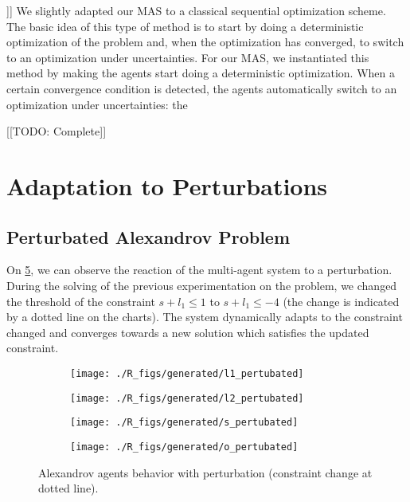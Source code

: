 ]]
We slightly adapted our MAS to a classical sequential optimization scheme. The basic idea of this type of method is to start by doing a deterministic optimization of the problem and, when the optimization has converged, to switch to an optimization under uncertainties. For our MAS, we instantiated this method by making the agents start doing a deterministic optimization. When a certain convergence condition is detected, the agents automatically switch to  an optimization under uncertainties: the 

[[TODO: Complete]]

\section{Adaptation to Perturbations}

\subsection{Perturbated Alexandrov Problem}
 
On \figurename{} \ref{alexandrov_res_pert}, we can observe the reaction of the multi-agent system to a perturbation. During the solving of the previous experimentation on the problem, we changed the threshold of the constraint $s + l_1 \leq 1$ to $s + l_1 \leq -4$ (the change is indicated by a dotted line on the charts). The system dynamically adapts to the constraint changed and converges towards a new solution which satisfies the updated constraint.

\begin{figure}[]
\centering
	\begin{subfigure}[b]{0.4\textwidth}
		\centering
		\texttt{[image: ./R\_figs/generated/l1\_pertubated]}
		\label{alexandrov_res_pert:l1}
	\end{subfigure}
	\begin{subfigure}[b]{0.4\textwidth}
		\centering
		\texttt{[image: ./R\_figs/generated/l2\_pertubated]}
		\label{alexandrov_res_pert:l2}
	\end{subfigure}

	\begin{subfigure}[b]{0.4\textwidth}
		\centering
		\texttt{[image: ./R\_figs/generated/s\_pertubated]}
		\label{alexandrov_res_pert:s}
	\end{subfigure}
	\begin{subfigure}[b]{0.4\textwidth}
		\centering
		\texttt{[image: ./R\_figs/generated/o\_pertubated]}
		\label{alexandrov_res_pert:o}
	\end{subfigure}
	
	\caption{Alexandrov agents behavior with perturbation (constraint change at dotted line).}
	\label{alexandrov_res_pert}
	
\end{figure}

